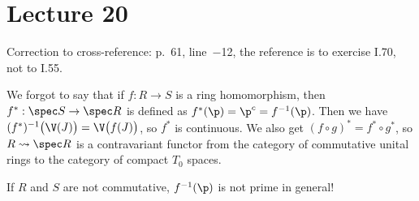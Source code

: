  \section{Lecture 20}

 Correction to cross-reference: p.~61, line~$-$12, the reference is to exercise I.70, not
 to I.55.

 We forgot to say that if $f:R\to S$ is a ring homomorphism, then $f^*:\spec S\to \spec
 R$ is defined as $f^*(\p)=\p^c=f^{-1}(\p)$. Then we have $(f^*)^{-1}\bigl(
 \V(J)\bigr)=\V\bigl(f(J)\bigr)$, so $f^*$ is continuous. We also get $(f\circ
 g)^*=f^*\circ g^*$, so $R\rightsquigarrow \spec R$ is a contravariant functor from
 the category of commutative unital rings to the category of compact $T_0$ spaces.

 \begin{remark}
   If $R$ and $S$ are not commutative, $f^{-1}(\p)$ is not prime in general!
 \end{remark}

